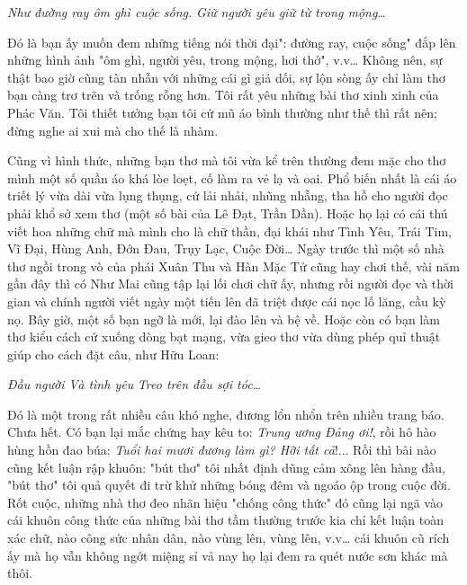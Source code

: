 \documentclass[../main.tex]{subfiles}
\begin{document}
\begin{multicols}{2}
\begin{blockquote}
\textit{Như đường ray ôm ghì cuộc sống. }        
\textit{Giữ người yêu giữ từ trong mộng}…  

\end{blockquote}
 
Đó là bạn ấy muốn đem những tiếng nói thời đại": đường ray, cuộc sống" đắp lên những hình ảnh "ôm ghì, người yêu, trong mộng, hơi thở", v.v… Không nên, sự thật bao giờ cũng tàn nhẫn với những cái gì giả dối, sự lộn sòng ấy chỉ làm thơ bạn càng trơ trẽn và trống rỗng hơn. Tôi rất yêu những bài thơ xinh xinh của Phác Văn. Tôi thiết tưởng bạn tôi cứ mũ áo bình thường như thế thì rất nên; đừng nghe ai xui mà cho thế là nhàm. 
 
Cũng vì hình thức, những bạn thơ mà tôi vừa kể trên thường đem mặc cho thơ mình một số quần áo khá lòe loẹt, cố làm ra vẻ lạ và oai. Phổ biến nhất là cái áo triết lý vừa dài vừa lụng thụng, cứ lải nhải, nhũng nhẵng, tha hồ cho người đọc phải khổ sở xem thơ (một số bài của Lê Đạt, Trần Dần). Hoặc họ lại có cái thú viết hoa những chữ mà mình cho là chữ thần, đại khái như Tình Yêu, Trái Tim, Vĩ Đại, Hùng Anh, Đớn Đau, Trụy Lạc, Cuộc Đời… Ngày trước thì một số nhà thơ ngồi trong vò của phái Xuân Thu và Hàn Mặc Tử cũng hay chơi thế, vài năm gần đây thì có Như Mai cũng tập lại lối chơi chữ ấy, nhưng rồi người đọc và thời gian và chính người viết ngày một tiến lên đã triệt được cái nọc lố lăng, cầu kỳ nọ. Bây giờ, một số bạn ngỡ là mới, lại đào lên và bệ về. Hoặc còn có bạn làm thơ kiểu cách cứ xuống dòng bạt mạng, vừa gieo thơ vừa dùng phép quỉ thuật giúp cho cách đặt câu, như Hữu Loan:        
\begin{blockquote}
        
\textit{Đầu người}        
\textit{Và tình yêu} 
\textit{Treo trên đầu sợi tóc…} 

\end{blockquote}
 
Đó là một trong rất nhiều câu khó nghe, đương lổn nhổn trên nhiều trang báo. Chưa hết. Có bạn lại mắc chứng hay kêu to: \textit{Trung ương Đảng ơi!}, rồi hô hào hùng hồn đao búa: \textit{Tuổi hai mươi đương làm gì? Hỡi tất cả}!... Rồi thì bài nào cũng kết luận rập khuôn: "bút thơ" tôi nhất định dũng cảm xông lên hàng đầu, "bút thơ" tôi quả quyết đi trừ khử những bóng đêm và ngoáo ộp trong cuộc đời. Rốt cuộc, những nhà thơ đeo nhãn hiệu "chống công thức" đó cũng lại ngã vào cái khuôn công thức của những bài thơ tầm thường trước kia chỉ kết luận toàn xác chữ, nào công sức nhân dân, nào vùng lên, vùng lên, v.v… cái khuôn cũ rích ấy mà họ vẫn không ngớt miệng sỉ vả nay họ lại đem ra quét nước sơn khác mà thôi. 
 

\end{multicols}
\end{document}
